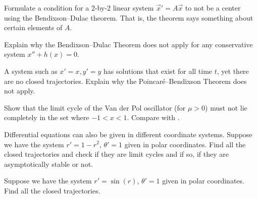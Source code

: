 \begin{exercise}
Formulate a condition for a 2-by-2 linear system
${\vec{x}}' = A \vec{x}$ to not be a center using the Bendixson--Dulac theorem.
That is, the theorem says something about certain elements of $A$.
\end{exercise}

\begin{exercise}
Explain why the Bendixson--Dulac Theorem does not apply for any conservative
system $x''+h(x) = 0$.
\end{exercise}

\begin{exercise}
A system such as $x'=x, y'=y$ has solutions that exist for all time $t$,
yet there are no closed trajectories.  Explain
why the Poincar\'e--Bendixson Theorem does not apply.
\end{exercise}

\begin{exercise}\ansMark%
Show that the limit cycle
of the 
Van der Pol oscillator (for $\mu > 0$) must not lie completely in the set
where 
$-1 < x < 1$.
Compare with .
\end{exercise}

\begin{exercise}
Differential equations can also be given in different coordinate systems.  
Suppose we have the system $r' = 1-r^2$, $\theta' = 1$ given
in polar coordinates.  Find all the closed trajectories and check if they
are limit cycles and if so, if they are asymptotically stable or not.
\end{exercise}

\begin{exercise}\ansMark%
Suppose we have the system $r' = \sin(r)$, $\theta' = 1$ given
in polar coordinates.  Find all the closed trajectories.
\end{exercise}



\setcounter{exercise}{100}

